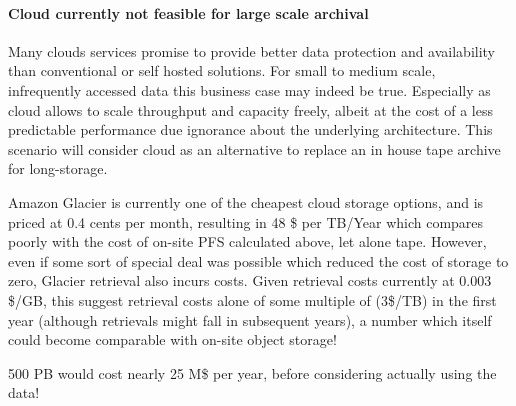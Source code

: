 \documentclass{../../template/esiwace-report}
\begin{document}



\paragraph{Cloud currently not feasible for large scale archival}

Many clouds services promise to provide better data protection and availability than conventional or self hosted solutions.
For small to medium scale, infrequently accessed data this business case may indeed be true.
Especially as cloud allows to scale throughput and capacity freely, albeit at the cost of a less predictable performance due ignorance about the underlying architecture.
This scenario will consider cloud as an alternative to replace an in house tape archive for long-storage.

Amazon Glacier is currently  one of the cheapest cloud storage options, and is priced at 0.4 cents per month, resulting in 48 \$ per TB/Year which compares poorly with the cost of on-site PFS calculated above, let alone tape.  However, even if some sort of special deal was possible which reduced the cost of storage to zero, Glacier retrieval also incurs costs.  Given retrieval costs currently at $0.003$\$/GB, this suggest retrieval costs alone of some multiple of (3\$/TB)  in the first year (although retrievals might fall in subsequent years), a number which itself could become comparable with on-site object storage!

500 PB would cost nearly 25 M\$ per year,  before considering actually using the data!

%
%
%
%
%
%
%
%
\end{document}
